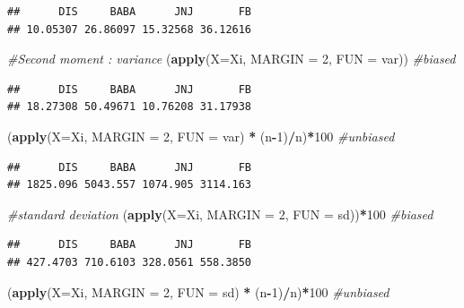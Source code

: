 \documentclass[]{article}
\newenvironment{Shaded}{\begin{snugshade}}{\end{snugshade}}
\newcommand{\KeywordTok}[1]{\textcolor[rgb]{0.13,0.29,0.53}{\textbf{#1}}}
\newcommand{\DataTypeTok}[1]{\textcolor[rgb]{0.13,0.29,0.53}{#1}}
\newcommand{\DecValTok}[1]{\textcolor[rgb]{0.00,0.00,0.81}{#1}}
\newcommand{\StringTok}[1]{\textcolor[rgb]{0.31,0.60,0.02}{#1}}
\newcommand{\CommentTok}[1]{\textcolor[rgb]{0.56,0.35,0.01}{\textit{#1}}}
\newcommand{\OperatorTok}[1]{\textcolor[rgb]{0.81,0.36,0.00}{\textbf{#1}}}
\newcommand{\NormalTok}[1]{#1}
\begin{document}
\begin{verbatim}
##      DIS     BABA      JNJ       FB 
## 10.05307 26.86097 15.32568 36.12616
\end{verbatim}

\begin{Shaded}
\begin{Highlighting}[]
\CommentTok{#Second moment : variance }
\NormalTok{(}\KeywordTok{apply}\NormalTok{(}\DataTypeTok{X=}\NormalTok{Xi, }\DataTypeTok{MARGIN =} \DecValTok{2}\NormalTok{, }\DataTypeTok{FUN =}\NormalTok{ var)) }\CommentTok{#biased }
\end{Highlighting}
\end{Shaded}

\begin{verbatim}
##      DIS     BABA      JNJ       FB 
## 18.27308 50.49671 10.76208 31.17938
\end{verbatim}

\begin{Shaded}
\begin{Highlighting}[]
\NormalTok{(}\KeywordTok{apply}\NormalTok{(}\DataTypeTok{X=}\NormalTok{Xi, }\DataTypeTok{MARGIN =} \DecValTok{2}\NormalTok{, }\DataTypeTok{FUN =}\NormalTok{ var) }\OperatorTok{*}\StringTok{ }\NormalTok{(n}\OperatorTok{-}\DecValTok{1}\NormalTok{)}\OperatorTok{/}\NormalTok{n)}\OperatorTok{*}\DecValTok{100} \CommentTok{#unbiased}
\end{Highlighting}
\end{Shaded}

\begin{verbatim}
##      DIS     BABA      JNJ       FB 
## 1825.096 5043.557 1074.905 3114.163
\end{verbatim}

\begin{Shaded}
\begin{Highlighting}[]
\CommentTok{#standard deviation}
\NormalTok{(}\KeywordTok{apply}\NormalTok{(}\DataTypeTok{X=}\NormalTok{Xi, }\DataTypeTok{MARGIN =} \DecValTok{2}\NormalTok{, }\DataTypeTok{FUN =}\NormalTok{ sd))}\OperatorTok{*}\DecValTok{100} \CommentTok{#biased }
\end{Highlighting}
\end{Shaded}

\begin{verbatim}
##      DIS     BABA      JNJ       FB 
## 427.4703 710.6103 328.0561 558.3850
\end{verbatim}

\begin{Shaded}
\begin{Highlighting}[]
\NormalTok{(}\KeywordTok{apply}\NormalTok{(}\DataTypeTok{X=}\NormalTok{Xi, }\DataTypeTok{MARGIN =} \DecValTok{2}\NormalTok{, }\DataTypeTok{FUN =}\NormalTok{ sd) }\OperatorTok{*}\StringTok{ }\NormalTok{(n}\OperatorTok{-}\DecValTok{1}\NormalTok{)}\OperatorTok{/}\NormalTok{n)}\OperatorTok{*}\DecValTok{100} \CommentTok{#unbiased}
\end{Highlighting}
\end{Shaded}
\end{document}
